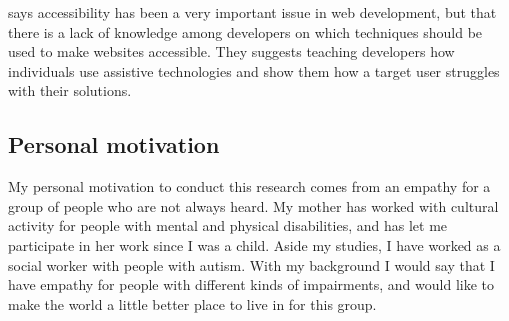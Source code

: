 \textcite{Freire2008} says accessibility has been a very important issue in web development, but that there is a lack of knowledge among developers on which techniques should be used to make websites accessible. They suggests teaching developers how individuals use assistive technologies and show them how a target user struggles with their solutions.

\subsection{Personal motivation}
My personal motivation to conduct this research comes from an empathy for a group of people who are not always heard. My mother has worked with cultural activity for people with mental and physical disabilities, and has let me participate in her work since I was a child. Aside my studies, I have worked as a social worker with people with autism. With my background I would say that I have empathy for people with different kinds of impairments, and would like to make the world a little better place to live in for this group. 




